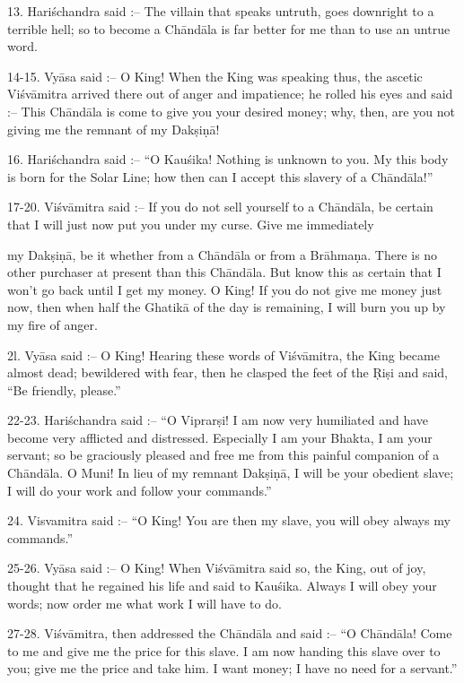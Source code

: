 13. Hari\'schandra said :-- The villain that speaks untruth, goes downright to a terrible hell; so to become a Ch\=and\=ala is far better for me than to use an untrue word.

14-15. Vy\=asa said :-- O King! When the King was speaking thus, the ascetic Vi\'sv\=amitra arrived there out of anger and impatience; he rolled his eyes and said :-- This Ch\=and\=ala is come to give you your desired money; why, then, are you not giving me the remnant of my Dak\d{s}i\d{n}\=a!

16. Hari\'schandra said :-- ``O Kau\'sika! Nothing is unknown to you. My this body is born for the Solar Line; how then can I accept this slavery of a Ch\=and\=ala!''

17-20. Vi\'sv\=amitra said :-- If you do not sell yourself to a Ch\=and\=ala, be certain that I will just now put you under my curse. Give me immediately

my Dak\d{s}i\d{n}\=a, be it whether from a Ch\=and\=ala or from a Br\=ahma\d{n}a. There is no other purchaser at present than this Ch\=and\=ala. But know this as certain that I won't go back until I get my money. O King! If you do not give me money just now, then when half the Ghatik\=a of the day is remaining, I will burn you up by my fire of anger.

2l. Vy\=asa said :-- O King! Hearing these words of Vi\'sv\=amitra, the King became almost dead; bewildered with fear, then he clasped the feet of the \d{R}i\d{s}i and said, ``Be friendly, please.''

22-23. Hari\'schandra said :-- ``O Viprar\d{s}i! I am now very humiliated and have become very afflicted and distressed. Especially I am your Bhakta, I am your servant; so be graciously pleased and free me from this painful companion of a Ch\=and\=ala. O Muni! In lieu of my remnant Dak\d{s}i\d{n}\=a, I will be your obedient slave; I will do your work and follow your commands.''

24. Visvamitra said :-- ``O King! You are then my slave, you will obey always my commands.''

25-26. Vy\=asa said :-- O King! When Vi\'sv\=amitra said so, the King, out of joy, thought that he regained his life and said to Kau\'sika. Always I will obey your words; now order me what work I will have to do.

27-28. Vi\'sv\=amitra, then addressed the Ch\=and\=ala and said :-- ``O Ch\=and\=ala! Come to me and give me the price for this slave. I am now handing this slave over to you; give me the price and take him. I want money; I have no need for a servant.''

